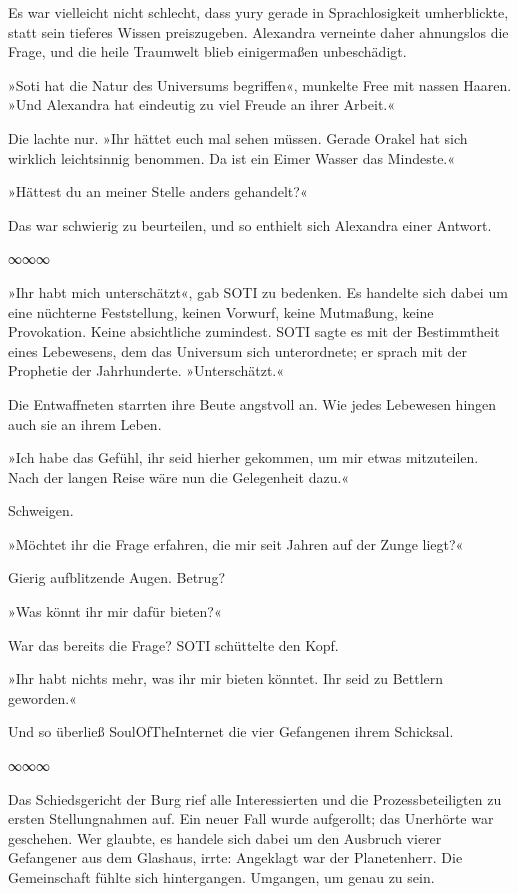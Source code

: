 Es war vielleicht nicht schlecht, dass yury gerade in Sprachlosigkeit umherblickte, statt sein tieferes Wissen preiszugeben. Alexandra verneinte daher ahnungslos die Frage, und die heile Traumwelt blieb einigermaßen unbeschädigt.

»Soti hat die Natur des Universums begriffen«, munkelte Free mit nassen Haaren. »Und Alexandra hat eindeutig zu viel Freude an ihrer Arbeit.«

Die lachte nur. »Ihr hättet euch mal sehen müssen. Gerade Orakel hat sich wirklich leichtsinnig benommen. Da ist ein Eimer Wasser das Mindeste.«

»Hättest du an meiner Stelle anders gehandelt?«

Das war schwierig zu beurteilen, und so enthielt sich Alexandra einer Antwort.

\begin{center}
∞∞∞
\end{center}

»Ihr habt mich unterschätzt«, gab SOTI zu bedenken. Es handelte sich dabei um eine nüchterne Feststellung, keinen Vorwurf, keine Mutmaßung, keine Provokation. Keine absichtliche zumindest. SOTI sagte es mit der Bestimmtheit eines Lebewesens, dem das Universum sich unterordnete; er sprach mit der Prophetie der Jahrhunderte. »Unterschätzt.«

Die Entwaffneten starrten ihre Beute angstvoll an. Wie jedes Lebewesen hingen auch sie an ihrem Leben.

»Ich habe das Gefühl, ihr seid hierher gekommen, um mir etwas mitzuteilen. Nach der langen Reise wäre nun die Gelegenheit dazu.«

Schweigen.

»Möchtet ihr die Frage erfahren, die mir seit Jahren auf der Zunge liegt?«

Gierig aufblitzende Augen. Betrug?

»Was könnt ihr mir dafür bieten?«

War das bereits die Frage? SOTI schüttelte den Kopf.

»Ihr habt nichts mehr, was ihr mir bieten könntet. Ihr seid zu Bettlern geworden.«

Und so überließ SoulOfTheInternet die vier Gefangenen ihrem Schicksal.

\begin{center}
∞∞∞
\end{center}

Das Schiedsgericht der Burg rief alle Interessierten und die Prozessbeteiligten zu ersten Stellungnahmen auf. Ein neuer Fall wurde aufgerollt; das Unerhörte war geschehen. Wer glaubte, es handele sich dabei um den Ausbruch vierer Gefangener aus dem Glashaus, irrte: Angeklagt war der Planetenherr. Die Gemeinschaft fühlte sich hintergangen. Umgangen, um genau zu sein.

